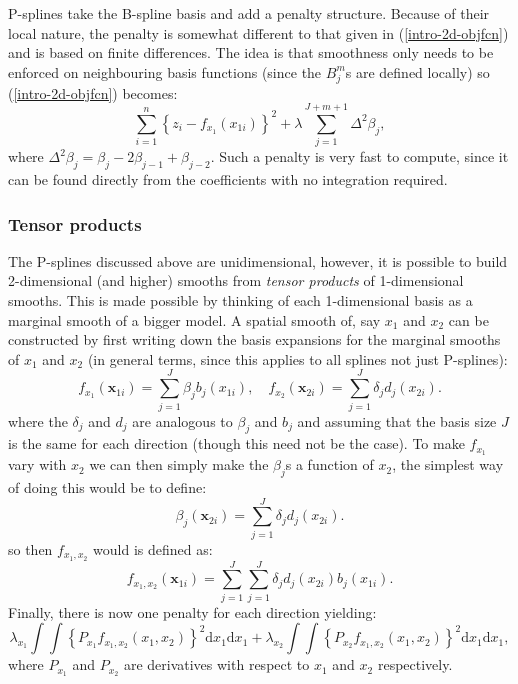P-splines take the B-spline basis and add a penalty structure. Because of their local nature, the penalty is somewhat different to that given in (\ref{intro-2d-objfcn}) and is based on finite differences. The idea is that smoothness only needs to be enforced on neighbouring basis functions (since the $B^m_j$s are defined locally) so (\ref{intro-2d-objfcn}) becomes:
\begin{equation*}
\sum_{i=1}^n \left \{ z_i - f_{x_1}(x_{1i}) \right \}^2 +  \lambda \sum_{j=1}^{J+m+1} \Delta^2 \beta_j,
\end{equation*}
where $\Delta^2 \beta_j = \beta_j -2\beta_{j-1} + \beta_{j-2}$. Such a penalty is very fast to compute, since it can be found directly from the coefficients with no integration required.

\subsubsection{Tensor products}
\label{GAMtensor}

The P-splines discussed above are unidimensional, however, it is possible to build 2-dimensional (and higher) smooths from \textit{tensor products} of 1-dimensional smooths. This is made possible by thinking of each 1-dimensional basis as a marginal smooth of a bigger model. A spatial smooth of, say $x_1$ and $x_2$ can be constructed by first writing down the basis expansions for the marginal smooths of $x_1$ and $x_2$ (in general terms, since this applies to all splines not just P-splines):
\begin{equation*}
f_{x_1}(\mathbf{x}_{1i}) = \sum_{j=1}^J \beta_j b_j(x_{1i}), \quad  f_{x_2}(\mathbf{x}_{2i}) = \sum_{j=1}^J \delta_j d_j(x_{2i}).
\end{equation*}
where the $\delta_j$ and $d_j$ are analogous to $\beta_j$ and $b_j$ and assuming that the basis size $J$ is the same for each direction (though this need not be the case). To make $f_{x_1}$ vary with $x_2$ we can then simply make the $\beta_j$s a function of $x_2$, the simplest way of doing this would be to define:
\begin{equation*}
\beta_j(\mathbf{x}_{2i}) = \sum_{j=1}^J \delta_j d_j(x_{2i}).
\end{equation*}
so then $f_{x_1,x_2}$ would is defined as:
\begin{equation*}
f_{x_1, x_2}(\mathbf{x}_{1i}) = \sum_{j=1}^J \sum_{j=1}^J \delta_j d_j(x_{2i}) b_j(x_{1i}).
\end{equation*}
Finally, there is now one penalty for each direction yielding:
\begin{equation*}
\lambda_{x_1} \int\int \left \{P_{x_1} f_{x_1, x_2}(x_1,x_2)\right \}^2 \text{d}x_1\text{d}x_1 + \lambda_{x_2} \int\int \left \{P_{x_2} f_{x_1, x_2}(x_1,x_2)\right \}^2 \text{d}x_1\text{d}x_1,
\end{equation*}
where $P_{x_1}$ and $P_{x_2}$ are derivatives with respect to $x_1$ and $x_2$ respectively. 

